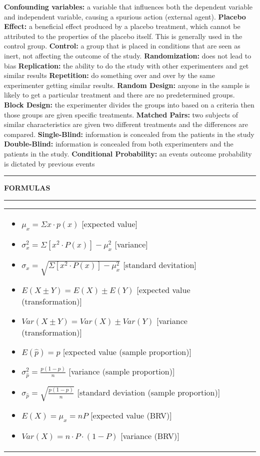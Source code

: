 \documentclass[6pt]{article}
\newcommand{\HL}{\par\noindent\rule{\textwidth}{0.4pt}}
\begin{document}
\begin{footnotesize}
\textbf{Confounding variables:} a variable that influences both the dependent variable and independent variable, causing a spurious action (external agent).
\textbf{Placebo Effect:} a beneficial effect produced by a placebo treatment, which cannot be attributed to the properties of the placebo itself. This is generally used in the control group.
\textbf{Control:} a group that is placed in conditions that are seen as inert, not affecting the outcome of the study.
\textbf{Randomization:} does not lead to bias
\textbf{Replication:} the ability to do the study with other experimenters and get similar results
\textbf{Repetition:} do something over and over by the same experimenter getting similar results.
\textbf{Random Design:} anyone in the sample is likely to get a particular treatment and there are no predetermined groups.
\textbf{Block Design:} the experimenter divides the groups into based on a criteria then those groups are given specific treatments.
\textbf{Matched Pairs:} two subjects of similar characteristics are given two different treatments and the differences are compared.
\textbf{Single-Blind:} information is concealed from the patients in the study
\textbf{Double-Blind:} information is  concealed from both experimenters and the patients in the study.
\textbf{Conditional Probability:} an events outcome probability is dictated by previous events

\HL

\begin{flushleft}
\textbf{FORMULAS}
\end{flushleft}

\HL

\begin{tabular}{l | l}

\parbox{0.5\textwidth}{

\begin{itemize}

\item $\mu_{x} = \Sigma x \cdot p(x)$ [expected value]
\item $\sigma^{2}_{x} = \Sigma [x^{2} \cdot P(x)] - \mu^{2}_{x}$ [variance]
\item $\sigma_{x} = \sqrt{\Sigma [x^{2} \cdot P(x)] - \mu^{2}_{x}}$ [standard devitation]
\item $E(X \pm Y) = E(X) \pm E(Y)$ [expected value (transformation)]
\item $Var(X \pm Y) = Var(X) \pm Var(Y)$ [variance (transformation)]
\item $E(\hat{p}) = p$ [expected value (sample proportion)]
\item $\sigma_{\hat{p}}^2 = \frac{p(1-p)}{n}$ [variance (sample proportion)]
\item $\sigma_{\hat{p}} = \sqrt{\frac{p(1-p)}{n}}$ [standard deviation (sample proportion)]
\item $E(X) = \mu_{x} = nP$ [expected value (BRV)]
\item $Var(X) = n \cdot P \cdot (1-P)$ [variance (BRV)]
\end{itemize}

}
\end{tabular}
\end{footnotesize}
\end{document}
